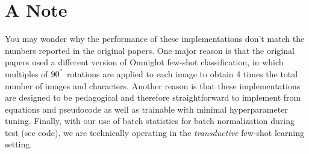 \documentclass[12pt]{article}
\begin{document}
\newpage
\section*{A Note}
You may wonder why the performance of these implementations don't match the numbers reported in the original papers. One major reason is that the original papers used a different version of Omniglot few-shot classification, in which multiples of $90^{\degree}$ rotations are applied to each image to obtain 4 times the total number of images and characters. Another reason is that these implementations are designed to be pedagogical and therefore straightforward to implement from equations and pseudocode as well as trainable with minimal hyperparameter tuning. Finally, with our use of batch statistics for batch normalization during test (see code), we are technically operating in the \emph{transductive} few-shot learning setting.

\newpage


\end{document}
